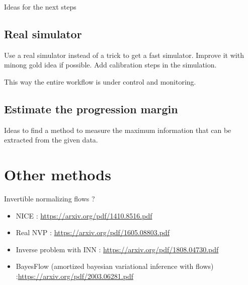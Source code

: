 Ideas for the next steps

\subsection{Real simulator} %
\label{sub:real_simulator}

Use a real simulator instead of a trick to get a fast simulator.
Improve it with minong gold idea if possible.
Add calibration steps in the simulation.

This way the entire workflow is under control and monitoring.



\subsection{Estimate the progression margin} %
\label{sub:estimate_the_progression_margin}

Ideas to find a method to measure the maximum information that can be extracted from the given data.





\section{Other methods} %
\label{sec:other_methods}

Invertible normalizing flows ?
\begin{itemize}
	\item NICE : \url{https://arxiv.org/pdf/1410.8516.pdf}
	\item Real NVP : \url{https://arxiv.org/pdf/1605.08803.pdf}
	\item Inverse problem with INN : \url{https://arxiv.org/pdf/1808.04730.pdf}
	\item BayesFlow (amortized bayesian variational inference with flows) :\url{https://arxiv.org/pdf/2003.06281.pdf}
\end{itemize}







